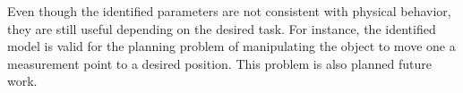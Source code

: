 \documentclass[runningheads,a4paper]{llncs}
\begin{document}
Even though the identified parameters are not consistent with physical behavior, they are still useful depending on the desired task. For instance, the identified model is valid for the planning problem of manipulating the object to move one a measurement point to a desired position.  This problem is also planned future work.



\end{document}
